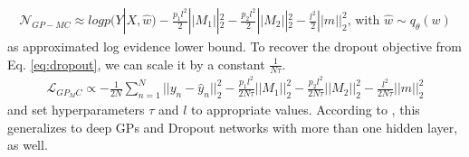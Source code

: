 \documentclass[a4paper,cleardoubleempty,BCOR1cm, 11pt]{report}
\begin{document}
\begin{align*}
\mathcal{N}_{GP-MC} \approx log p(Y|X, \hat{w}) - \frac{p_1 l^2}{2} ||M_1||^2_2 - \frac{p_2 l^2}{2}||M_2||^2_2 - \frac{l^2}{2}||m||^2_2 \text{, with } \hat{w} \sim q_{\theta}(w)
\end{align*}
as approximated log evidence lower bound.
To recover the dropout objective from Eq. \ref{eq:dropout}, we can scale it by a constant $\frac{1}{N \tau}$.
\begin{align*}
\mathcal{L}_{GP_MC} \propto  - \frac{1}{2N} \sum_{n=1}^N ||y_n - \hat{y}_n||^2_2 -  \frac{p_1 l^2}{2N\tau} ||M_1||^2_2 - \frac{p_2 l^2}{2N\tau}||M_2||^2_2 - \frac{l^2}{2N\tau}||m||^2_2
\end{align*}
and set hyperparameters $\tau$ and $l$ to appropriate values. According to \citet{gal2016dropout}, this generalizes to deep GPs and Dropout networks with more than one hidden layer, as well.
\end{document}
